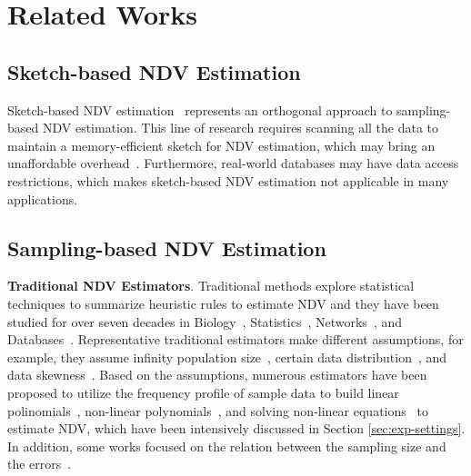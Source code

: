 \section{Related Works}
\subsection{Sketch-based NDV Estimation}
Sketch-based NDV estimation~\cite{harmouch2017cardinality,flajolet2007hyperloglog,ertl2023ultraloglog} represents an orthogonal approach to sampling-based NDV estimation. This line of research requires scanning all the data to maintain a memory-efficient sketch for NDV estimation, which may bring an unaffordable overhead~\cite{li2022sampling}. Furthermore, real-world databases may have data access restrictions, which makes sketch-based NDV estimation not applicable in many applications. 
\subsection{Sampling-based NDV Estimation}
\textbf{Traditional NDV Estimators}. Traditional methods explore statistical techniques to summarize heuristic rules to estimate NDV and they have been studied for over seven decades in Biology~\cite{valiant2013estimating,valiant2017estimating,mmo_bunge1993estimating}, Statistics~\cite{goodman1949estimation,chao1984nonparametric}, Networks~\cite{network_cohen2019cardinality,network_nath2008synopsis}, and Databases~\cite{spark_plan_code,pg_plan_code,mysql_join}. Representative traditional estimators make different assumptions, for example, they assume infinity population size~\cite{mmo_bunge1993estimating}, certain data distribution~\cite{motwani2006distinct,mmo_bunge1993estimating}, and data skewness~\cite{hybskew_haas1995sampling,gee_charikar2000towards}. Based on the assumptions, numerous estimators have been proposed to utilize the frequency profile of sample data to build linear polinomials~\cite{goodman1949estimation,gee_charikar2000towards,error_bound}, non-linear polynomials~\cite{chao_in_db_ozsoyoglu1991estimating,chaolee,chao1984nonparametric,shlosser1981estimation,burnham1978estimation,burnham1979robust,horvitz_sarndal1992model}, and solving non-linear equations~\cite{sichel1986parameter,sichel1986word,sichel1992anatomy,bootstrap_smith1984nonparametric,mmo_bunge1993estimating,hybskew_haas1995sampling} to estimate NDV, which have been intensively discussed in Section \ref{sec:exp-settings}. In addition, some works focused on the relation between the sampling size and the errors~\cite{valiant2017estimating,wu2019chebyshev,chien2021support}.

